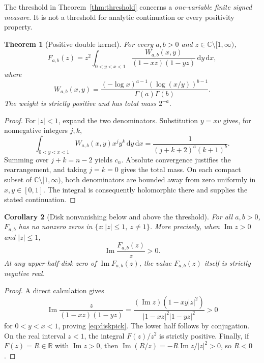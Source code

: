 \documentclass[11pt]{article}
\numberwithin{equation}{section}
\newtheorem{theorem}{Theorem}[section]
\newtheorem{corollary}[theorem]{Corollary}
\theoremstyle{definition}\newtheorem{definition}[theorem]{Definition}
\theoremstyle{remark}\newtheorem{remark}[theorem]{Remark}
\newcommand{\dd}{\,\mathrm d}
\newcommand{\R}{\mathbb R}
\newcommand{\C}{\mathbb C}
\DeclareMathOperator{\Impart}{Im}
\newcommand{\cut}{\C\setminus[1,\infty)}
\begin{document}
The threshold in Theorem~\ref{thm:threshold} concerns a
\emph{one-variable finite signed measure}. It is not a threshold for
analytic continuation or every positivity property.

\begin{theorem}[Positive double kernel]\label{thm:double}
For every $a,b>0$ and $z\in\cut$,
\begin{equation}\label{eq:double}
 F_{a,b}(z)=z^2\int_{0<y<x<1}
 \frac{W_{a,b}(x,y)}{(1-xz)(1-yz)}\dd y\dd x,
\end{equation}
where
\begin{equation}\label{eq:W}
 W_{a,b}(x,y)=\frac{(-\log x)^{a-1}(\log(x/y))^{b-1}}
 {\Gamma(a)\Gamma(b)}.
\end{equation}
The weight is strictly positive and has total mass $2^{-a}$.
\end{theorem}
\begin{proof}
For $|z|<1$, expand the two denominators. Substitution $y=xv$
gives, for nonnegative integers $j,k$,
\[
 \int_{0<y<x<1}W_{a,b}(x,y)x^jy^k\dd y\dd x
 =\frac1{(j+k+2)^a(k+1)^b}.
\]
Summing over $j+k=n-2$ yields $c_n$. Absolute convergence justifies
the rearrangement, and taking $j=k=0$ gives the total mass.
On each compact subset of $\cut$, both denominators are bounded
away from zero uniformly in $x,y\in[0,1]$. The integral is consequently
holomorphic there and supplies the stated continuation.
\end{proof}

\begin{corollary}[Disk nonvanishing below and above the threshold]
\label{cor:disk}
For all $a,b>0$, $F_{a,b}$ has no nonzero zeros in
$\{z:|z|\le1,\ z\ne1\}$. More precisely, when $\Impart z>0$ and
$|z|\le1$,
\begin{equation}\label{eq:diskpick}
 \Impart\frac{F_{a,b}(z)}z>0.
\end{equation}
At any upper-half-disk zero of $\Impart F_{a,b}(z)$, the value
$F_{a,b}(z)$ itself is strictly negative real.
\end{corollary}
\begin{proof}
A direct calculation gives
\[
 \Impart\frac{z}{(1-xz)(1-yz)}
 =\frac{(\Impart z)(1-xy|z|^2)}{|1-xz|^2|1-yz|^2}>0
\]
for $0<y<x<1$, proving \eqref{eq:diskpick}. The lower half follows
by conjugation. On the real interval $z<1$, the integral
$F(z)/z^2$ is strictly positive. Finally, if $F(z)=R\in\R$ with
$\Impart z>0$, then $\Impart(R/z)=-R\Impart z/|z|^2>0$, so $R<0$.
\end{proof}
\end{document}
